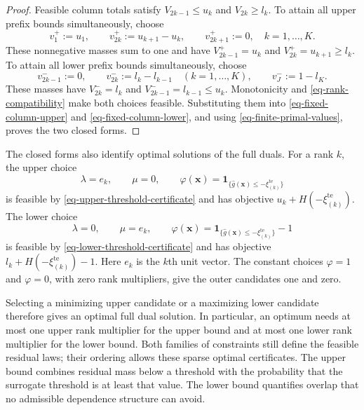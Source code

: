\documentclass[review,11pt,3p,authoryear,nopreprintline]{elsarticle}
\begin{document}
\begin{proof}
  Feasible column totals satisfy $V_{2k-1}\le u_k$ and $V_{2k}\ge l_k$. To attain all upper prefix bounds simultaneously, choose
  \begin{equation}
    v_1^+:=u_1,\qquad
    v_{2k}^+:=u_{k+1}-u_k,\qquad
    v_{2k+1}^+:=0,\quad k=1,\ldots,K.
    \label{eq-upper-column-allocation}
  \end{equation}
  These nonnegative masses sum to one and have
  $V_{2k-1}^+=u_k$ and $V_{2k}^+=u_{k+1}\ge l_k$.
  To attain all lower prefix bounds simultaneously, choose
  \begin{equation}
    v_{2k-1}^-:=0,\qquad
    v_{2k}^-:=l_k-l_{k-1}\quad(k=1,\ldots,K),
    \qquad v_J^-:=1-l_K.
    \label{eq-lower-column-allocation}
  \end{equation}
  These masses have $V_{2k}^-=l_k$ and
  $V_{2k-1}^-=l_{k-1}\le u_k$.
  Monotonicity and \eqref{eq-rank-compatibility} make both choices feasible. Substituting them into \eqref{eq-fixed-column-upper} and \eqref{eq-fixed-column-lower}, and using \eqref{eq-finite-primal-values}, proves the two closed forms.
\end{proof}

The closed forms also identify optimal solutions of the full duals. For a rank $k$, the upper choice
\[
  \lambda=e_k,\qquad \mu=0,\qquad
  \varphi(\bm x)=\mathbf1_{\{\hat g(\bm x)\le-\xi_{(k)}^{\mathrm{te}}\}}
\]
is feasible by \eqref{eq-upper-threshold-certificate} and has objective $u_k+H\left(-\xi_{(k)}^{\mathrm{te}}\right)$. The lower choice
\[
  \lambda=0,\qquad \mu=e_k,\qquad
  \varphi(\bm x)=\mathbf1_{\{\hat g(\bm x)\le-\xi_{(k)}^{\mathrm{te}}\}}-1
\]
is feasible by \eqref{eq-lower-threshold-certificate} and has objective $l_k+H\left(-\xi_{(k)}^{\mathrm{te}}\right)-1$. Here $e_k$ is the $k$th unit vector. The constant choices $\varphi=1$ and $\varphi=0$, with zero rank multipliers, give the outer candidates one and zero.

Selecting a minimizing upper candidate or a maximizing lower candidate therefore gives an optimal full dual solution. In particular, an optimum needs at most one upper rank multiplier for the upper bound and at most one lower rank multiplier for the lower bound. Both families of constraints still define the feasible residual laws; their ordering allows these sparse optimal certificates. The upper bound combines residual mass below a threshold with the probability that the surrogate threshold is at least that value. The lower bound quantifies overlap that no admissible dependence structure can avoid.
\end{document}
